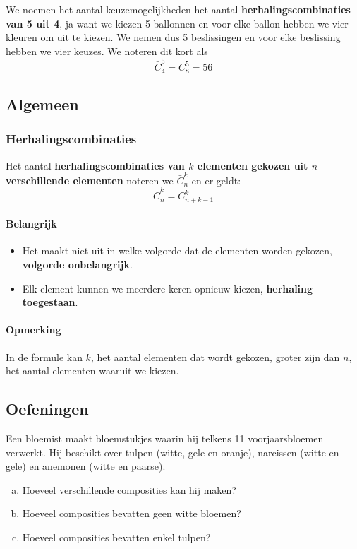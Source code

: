 \documentclass[12pt,a4paper,twoside]{article}
\begin{document}
We noemen het aantal keuzemogelijkheden het aantal {\bf herhalingscombinaties van 5 uit 4}, ja want we kiezen 5 ballonnen en voor elke ballon hebben we vier kleuren om uit te kiezen. We nemen dus 5 beslissingen en voor elke beslissing hebben we vier keuzes. We noteren dit kort als
\[\bar{C}^5_4=C^5_8=56\]

\subsection{Algemeen}

\subsubsection*{Herhalingscombinaties}
\begin{mdframed}
Het aantal {\bf herhalingscombinaties van $k$ elementen gekozen uit $n$ verschillende elementen} noteren we $\bar{C}^k_n$ en er geldt:
$$\bar{C}^k_n=C^k_{n+k-1}$$
\end{mdframed}

\paragraph*{Belangrijk}
\begin{itemize}
  \item Het maakt niet uit in welke volgorde dat de elementen worden gekozen, {\bf volgorde onbelangrijk}.
  \item Elk element kunnen we meerdere keren opnieuw kiezen, {\bf herhaling toegestaan}.
\end{itemize}

\paragraph*{Opmerking}
In de formule kan $k$, het aantal elementen dat wordt gekozen, groter zijn dan $n$, het aantal elementen waaruit we kiezen.

\subsection{Oefeningen}

\begin{oefening}
Een bloemist maakt bloemstukjes waarin hij telkens 11 voorjaarsbloemen verwerkt. Hij beschikt over tulpen (witte, gele en oranje), narcissen (witte en gele) en anemonen (witte en paarse).
\begin{enumerate}[(a)]
  \item Hoeveel verschillende composities kan hij maken?
  \item Hoeveel composities bevatten geen witte bloemen?
  \item Hoeveel composities bevatten enkel tulpen?
\end{enumerate}
\end{oefening}
\end{document}
